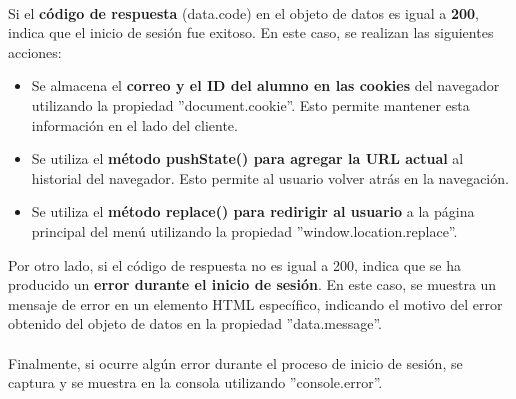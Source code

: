 \documentclass[12pt]{report}
\begin{document}
\\
Si el \textbf{código de respuesta} (data.code) en el objeto de datos es igual a \textbf{200}, indica que el inicio de sesión fue exitoso. En este caso, se realizan las siguientes acciones:
\\
\begin{itemize}
    \item Se almacena el \textbf{correo y el ID del alumno en las cookies} del navegador utilizando la propiedad ''document.cookie''. Esto permite mantener esta información en el lado del cliente. 
    \item Se utiliza el \textbf{método pushState() para agregar la URL actual} al historial del navegador. Esto permite al usuario volver atrás en la navegación. 
    \item Se utiliza el \textbf{método replace() para redirigir al usuario} a la página principal del menú utilizando la propiedad ''window.location.replace''.
\end{itemize}

Por otro lado, si el código de respuesta no es igual a 200, indica que se ha producido un \textbf{error durante el inicio de sesión}. En este caso, se muestra un mensaje de error en un elemento HTML específico, indicando el motivo del error obtenido del objeto de datos en la propiedad ''data.message''.
\\\\
Finalmente, si ocurre algún error durante el proceso de inicio de sesión, se captura y se muestra en la consola utilizando ''console.error''.
\end{document}
